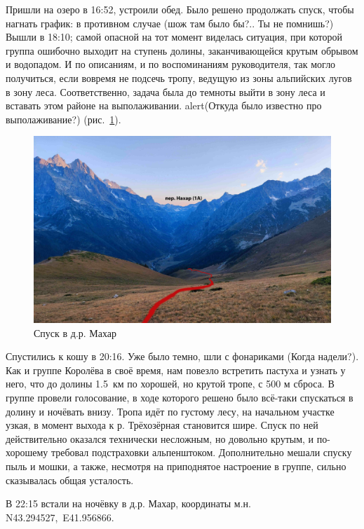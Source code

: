 Пришли на озеро в 16:52, устроили обед. Было решено продолжать спуск, чтобы нагнать график: в противном случае \alert{(шож там было бы?.. Ты не помнишь?)} Вышли в 18:10; самой опасной на тот момент виделась ситуация, при которой группа ошибочно выходит на ступень долины, заканчивающейся крутым обрывом и водопадом. И по описаниям, и по воспоминаниям руководителя, так могло получиться, если вовремя не подсечь тропу, ведущую из зоны альпийских лугов в зону леса. Соответственно, задача была до темноты выйти в зону леса и вставать этом районе на выполаживании. alert{(Откуда было известно про выполаживание?)} (рис.~\ref{fig:IMG_20240820_184645.jpg}).

\begin{figure}[h!]
	\centering
	\includegraphics[width=0.7\linewidth]{../pics/IMG_20240820_184645.jpg}
	\caption{Спуск в д.р. Махар}
	\label{fig:IMG_20240820_184645.jpg}
\end{figure}

Спустились к кошу в 20:16. Уже было темно, шли с фонариками \alert{(Когда надели?)}. Как и группе Королёва в своё время, нам повезло встретить пастуха и узнать у него, что до долины 1.5~км по хорошей, но крутой тропе, с 500 м сброса. В группе провели голосование, в ходе которого решено было всё-таки спускаться в долину и ночёвать внизу. Тропа идёт по густому лесу, на начальном участке узкая, в момент выхода к р. Трёхозёрная становится шире. Спуск по ней действительно оказался технически несложным, но довольно крутым, и по-хорошему требовал подстраховки альпенштоком. Дополнительно мешали спуску пыль и мошки, а также, несмотря на приподнятое настроение в группе, сильно сказывалась общая усталость.

В 22:15 встали на ночёвку в д.р. Махар, координаты м.н. N43.294527\degree,~E41.956866\degree.

\clearpage 

